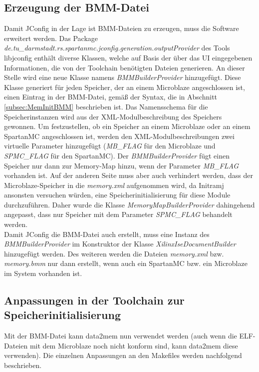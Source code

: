 \subsection{Erzeugung der BMM-Datei}
Damit JConfig in der Lage ist BMM-Dateien zu erzeugen, muss die Software erweitert werden. Das Package \textit{de.tu\_darmstadt.rs.spartanmc.jconfig.generation.outputProvider} des Tools libjconfig enthält diverse Klassen, welche auf Basis der über das UI eingegebenen Informationen, die von der Toolchain benötigten Dateien generieren. An dieser Stelle wird eine neue Klasse namens \textit{BMMBuilderProvider} hinzugefügt. Diese Klasse generiert für jeden Speicher, der an einem Microblaze angeschlossen ist, einen Eintrag in der BMM-Datei, gemäß der Syntax, die in Abschnitt \ref{subsec:MemInitBMM} beschrieben ist. Das Namensschema für die Speicherinstanzen wird aus der XML-Modulbeschreibung des Speichers gewonnen. Um festzustellen, ob ein Speicher an einem Microblaze oder an einem SpartanMC angeschlossen ist, werden den XML-Modulbeschreibungen zwei virtuelle Parameter hinzugefügt (\textit{MB\_FLAG} für den Microblaze und \textit{SPMC\_FLAG} für den SpartanMC). Der \textit{BMMBuilderProvider} fügt einen Speicher nur dann zur Memory-Map hinzu, wenn der Parameter \textit{MB\_FLAG} vorhanden ist. Auf der anderen Seite muss aber auch verhindert werden, dass der Microblaze-Speicher in die \textit{memory.xml} aufgenommen wird, da Initramj ansonsten versuchen würden, eine Speicherinitialisierung für diese Module durchzuführen. Daher wurde die Klasse \textit{MemoryMapBuilderProvider} dahingehend angepasst, dass nur Speicher mit dem Parameter \textit{SPMC\_FLAG} behandelt werden.\\
Damit JConfig die BMM-Datei auch erstellt, muss eine Instanz des \textit{BMMBuilderProvider} im Konstruktor der Klasse \textit{XilinxIseDocumentBuilder} hinzugefügt werden. Des weiteren werden die Dateien \textit{memory.xml} bzw. \textit{memory.bmm} nur dann erstellt, wenn auch ein SpartanMC bzw. ein Microblaze im System vorhanden ist.

\subsection{Anpassungen in der Toolchain zur Speicherinitialisierung}
Mit der BMM-Datei kann data2mem nun verwendet werden (auch wenn die ELF-Dateien mit dem Microblaze noch nicht konform sind, kann data2mem diese verwenden). Die einzelnen Anpassungen an den Makefiles werden nachfolgend beschrieben.
